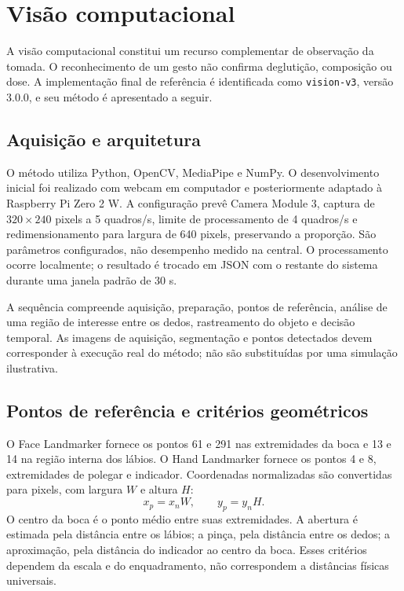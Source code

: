 \section{Visão computacional}\label{cap:visao}
A visão computacional constitui um recurso complementar de observação da tomada. O reconhecimento de um gesto não confirma deglutição, composição ou dose. A implementação final de referência é identificada como \texttt{vision-v3}, versão 3.0.0, e seu método é apresentado a seguir. 

\subsection{Aquisição e arquitetura}
O método utiliza Python, OpenCV, MediaPipe e NumPy. \cite{MEDIAPIPE_FACE,MEDIAPIPE_HAND} O desenvolvimento inicial foi realizado com webcam em computador e posteriormente adaptado à Raspberry Pi Zero 2 W. A configuração prevê Camera Module 3, captura de $320\times240$ pixels a 5 quadros/s, limite de processamento de 4 quadros/s e redimensionamento para largura de 640 pixels, preservando a proporção. São parâmetros configurados, não desempenho medido na central. O processamento ocorre localmente; o resultado é trocado em JSON com o restante do sistema durante uma janela padrão de 30 s. 

A sequência compreende aquisição, preparação, pontos de referência, análise de uma região de interesse entre os dedos, rastreamento do objeto e decisão temporal. As imagens de aquisição, segmentação e pontos detectados devem corresponder à execução real do método; não são substituídas por uma simulação ilustrativa.

\subsection{Pontos de referência e critérios geométricos}
O Face Landmarker fornece os pontos 61 e 291 nas extremidades da boca e 13 e 14 na região interna dos lábios. O Hand Landmarker fornece os pontos 4 e 8, extremidades de polegar e indicador. Coordenadas normalizadas são convertidas para pixels, com largura $W$ e altura $H$:
\begin{equation}\label{eq:vis-coordenadas}
x_p=x_nW,\qquad y_p=y_nH.
\end{equation}
O centro da boca é o ponto médio entre suas extremidades. A abertura é estimada pela distância entre os lábios; a pinça, pela distância entre os dedos; a aproximação, pela distância do indicador ao centro da boca. Esses critérios dependem da escala e do enquadramento, não correspondem a distâncias físicas universais. 


